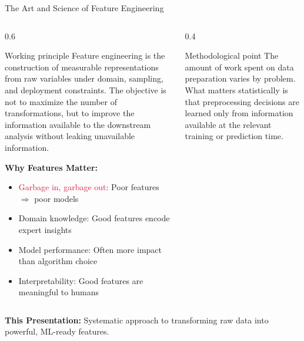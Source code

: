 \documentclass[aspectratio=169,11pt]{beamer}
\begin{document}
\begin{frame}{The Art and Science of Feature Engineering}
\begin{columns}
\begin{column}{0.6\textwidth}
\begin{block}{Working principle}
Feature engineering is the construction of measurable representations from raw variables under domain, sampling, and deployment constraints. The objective is not to maximize the number of transformations, but to improve the information available to the downstream analysis without leaking unavailable information.
\end{block}

\vspace{0.3cm}
\textbf{Why Features Matter:}
\begin{itemize}
\item \textcolor{crimson}{Garbage in, garbage out}: Poor features $\Rightarrow$ poor models
\item \textcolor{forest}{Domain knowledge}: Good features encode expert insights
\item \textcolor{forest}{Model performance}: Often more impact than algorithm choice
\item \textcolor{forest}{Interpretability}: Good features are meaningful to humans
\end{itemize}
\end{column}
\begin{column}{0.4\textwidth}
\begin{figure}
\centering
{}
\end{figure}

\begin{alertblock}{Methodological point}
The amount of work spent on data preparation varies by problem. What matters statistically is that preprocessing decisions are learned only from information available at the relevant training or prediction time.
\end{alertblock}
\end{column}
\end{columns}

\vspace{0.3cm}
\textbf{This Presentation:} Systematic approach to transforming raw data into powerful, ML-ready features.
\end{frame}
\end{document}
